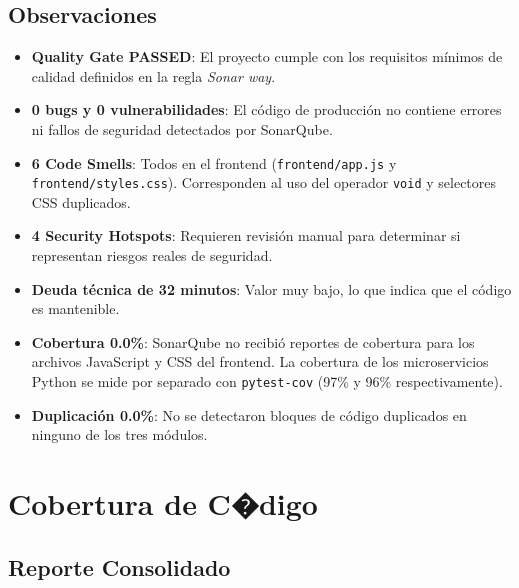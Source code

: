 \documentclass[12pt,a4paper]{article}
\begin{document}
\subsection{Observaciones}

\begin{itemize}
  \item \textbf{Quality Gate PASSED}: El proyecto cumple con los requisitos
        m\'inimos de calidad definidos en la regla \textit{Sonar way}.
  \item \textbf{0 bugs y 0 vulnerabilidades}: El c\'odigo de producci\'on no
        contiene errores ni fallos de seguridad detectados por SonarQube.
  \item \textbf{6 Code Smells}: Todos en el frontend (\texttt{frontend/app.js}
        y \texttt{frontend/styles.css}). Corresponden al uso del operador
        \texttt{void} y selectores CSS duplicados.
  \item \textbf{4 Security Hotspots}: Requieren revisi\'on manual para
        determinar si representan riesgos reales de seguridad.
  \item \textbf{Deuda t\'ecnica de 32 minutos}: Valor muy bajo, lo que indica
        que el c\'odigo es mantenible.
  \item \textbf{Cobertura 0.0\%}: SonarQube no recibi\'o reportes de cobertura
        para los archivos JavaScript y CSS del frontend. La cobertura de los
        microservicios Python se mide por separado con \texttt{pytest-cov}
        (97\% y 96\% respectivamente).
  \item \textbf{Duplicaci\'on 0.0\%}: No se detectaron bloques de c\'odigo
        duplicados en ninguno de los tres m\'odulos.
\end{itemize}



\section{Cobertura de C�digo}

\subsection{Reporte Consolidado}
\end{document}
